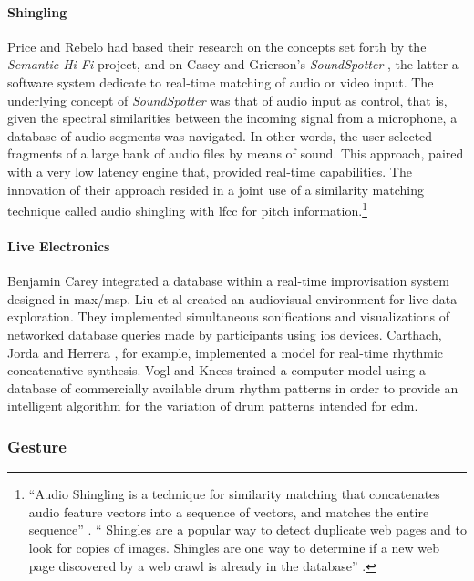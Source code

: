 \paragraph{Shingling}
Price and Rebelo had based their research on the concepts set forth by the \textit{Semantic Hi-Fi} project, and on Casey and Grierson's \textit{SoundSpotter} \parencite{DBLP:conf/icmc/CaseyG07}, the latter a software system dedicate to real-time matching of audio or video input. The underlying concept of \textit{SoundSpotter} was that of audio input as control, that is, given the spectral similarities between the incoming signal from a microphone, a database of audio segments was navigated. In other words, the user selected fragments of a large bank of audio files by means of sound. This approach, paired with a very low latency engine that, provided real-time capabilities. The innovation of their approach resided in a joint use of a similarity matching technique called audio shingling with \gls{lfcc} for pitch information.\footnote{``Audio Shingling is a technique for similarity matching that concatenates audio feature vectors into a sequence of vectors, and matches the entire sequence'' \parencite{DBLP:conf/icmc/CaseyG07}. `` Shingles are a popular way to detect duplicate web pages and to look for copies of images. Shingles are one way to determine if a new web page discovered by a web crawl is already in the database'' \parencite{DBLP:conf/ismir/CaseyS06}.}

\paragraph{Live Electronics}
Benjamin Carey \parencite{Carey:2012} integrated a database within a real-time improvisation system designed in \gls{max/msp}. Liu et al \parencite{Liu:2013} created an audiovisual environment for live data exploration. They implemented simultaneous sonifications and visualizations of networked database queries made by participants using \gls{ios} devices. Carthach, Jorda and Herrera \parencite{Nuannicode225in2016}, for example, implemented a model for real-time rhythmic concatenative synthesis. Vogl and Knees \parencite{rvogl:2017} trained a computer model using a database of commercially available drum rhythm patterns in order to provide an intelligent algorithm for the variation of drum patterns intended for \gls{edm}.


\subsubsection{Gesture}
\label{application:gesture}


